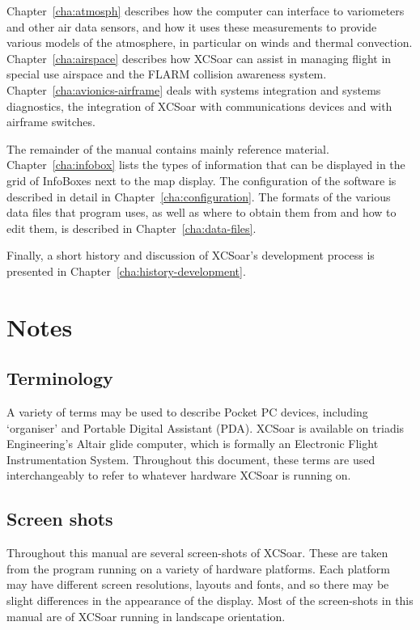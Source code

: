 \documentclass[a4paper,12pt]{refrep}
\begin{document}
Chapter~\ref{cha:atmosph} describes how the computer can interface to
variometers and other air data sensors, and how it uses these
measurements to provide various models of the atmosphere, in
particular on winds and thermal convection.
Chapter~\ref{cha:airspace} describes how XCSoar can assist in managing
flight in special use airspace and the FLARM collision awareness
system.  Chapter~\ref{cha:avionics-airframe} deals with systems
integration and systems diagnostics, the integration of XCSoar with
communications devices and with airframe switches.

The remainder of the manual contains mainly reference material.
Chapter~\ref{cha:infobox} lists the types of information that can be
displayed in the grid of InfoBoxes next to the map display.  The
configuration of the software is described in detail in
Chapter~\ref{cha:configuration}.  The formats of the various data
files that program uses, as well as where to obtain them from and how
to edit them, is described in Chapter~\ref{cha:data-files}.

Finally, a short history and discussion of XCSoar's development
process is presented in Chapter~\ref{cha:history-development}.

\section{Notes}

\subsection*{Terminology}
A variety of terms may be used to describe Pocket PC devices,
including `organiser' and Portable Digital Assistant (PDA).  XCSoar is
available on triadis Engineering's Altair glide computer, which is
formally an Electronic Flight Instrumentation System.  Throughout this
document, these terms are used interchangeably to refer to whatever
hardware XCSoar is running on.

\subsection*{Screen shots}

Throughout this manual are several screen-shots of XCSoar.  These are
taken from the program running on a variety of hardware platforms.
Each platform may have different screen resolutions, layouts and
fonts, and so there may be slight differences in the appearance of the
display.  Most of the screen-shots in this manual are of XCSoar running
in landscape orientation.
\end{document}

